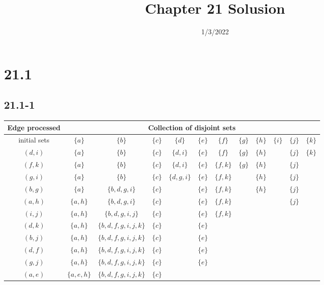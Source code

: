 

\title{Chapter 21 Solusion}
\date{1/3/2022}


\maketitle

\section*{21.1}

\subsection*{21.1-1}

\begin{tabular}{c|ccccccccccc}
    Edge processed & \multicolumn{11}{c}{Collection of disjoint sets} \\
    \hline
    initial sets & $\{ a \}$ & $\{ b \}$ & $\{ c \}$ & 
    $\{ d \}$ & $\{ e \}$ & $\{ f \}$ & $\{ g \}$ & 
    $\{ h \}$ & $\{ i \}$ & $\{ j \}$ & $\{ k \}$ \\
    $(d,i)$ & $\{ a \}$ & $\{ b \}$ & $\{ c \}$ & 
    $\{ d, i \}$ & $\{ e \}$ & $\{ f \}$ & $\{ g \}$ & 
    $\{ h \}$ &  & $\{ j \}$ & $\{ k \}$ \\
    $(f,k)$ & $\{ a \}$ & $\{ b \}$ & $\{ c \}$ & 
    $\{ d, i \}$ & $\{ e \}$ & $\{ f, k \}$ & $\{ g \}$ & 
    $\{ h \}$ &  & $\{ j \}$ &  \\
    $(g,i)$ & $\{ a \}$ & $\{ b \}$ & $\{ c \}$ & 
    $\{ d, g, i \}$ & $\{ e \}$ & $\{ f, k \}$ &  & 
    $\{ h \}$ &  & $\{ j \}$ &  \\
    $(b,g)$ & $\{ a \}$ & $\{ b, d, g, i \}$ & $\{ c \}$ & 
     & $\{ e \}$ & $\{ f, k \}$ &  & 
    $\{ h \}$ &  & $\{ j \}$ &  \\
    $(a,h)$ & $\{ a, h \}$ & $\{ b, d, g, i \}$ & $\{ c \}$ & 
     & $\{ e \}$ & $\{ f, k \}$ &  & 
     &  & $\{ j \}$ &  \\
    $(i,j)$ & $\{ a, h \}$ & $\{ b, d, g, i, j \}$ & $\{ c \}$ & 
     & $\{ e \}$ & $\{ f, k \}$ &  & 
     &  &  &  \\
    $(d,k)$ & $\{ a, h \}$ & $\{ b, d, f, g, i, j, k \}$ & $\{ c \}$ & 
     & $\{ e \}$ &  &  & 
     &  &  &  \\
    $(b,j)$ & $\{ a, h \}$ & $\{ b, d, f, g, i, j, k \}$ & $\{ c \}$ & 
     & $\{ e \}$ &  &  & 
     &  &  &  \\
    $(d,f)$ & $\{ a, h \}$ & $\{ b, d, f, g, i, j, k \}$ & $\{ c \}$ & 
     & $\{ e \}$ &  &  & 
     &  &  &  \\
    $(g,j)$ & $\{ a, h \}$ & $\{ b, d, f, g, i, j, k \}$ & $\{ c \}$ & 
     & $\{ e \}$ &  &  & 
     &  &  &  \\
    $(a,e)$ & $\{ a, e, h \}$ & $\{ b, d, f, g, i, j, k \}$ & $\{ c \}$ & 
     &  &  &  & 
     &  &  &  \\
\end{tabular}

